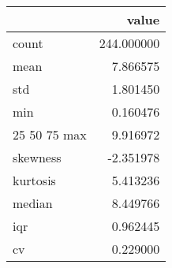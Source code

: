 \begin{tabular}{lr}
\toprule
 & value \\
\midrule
count & 244.000000 \\
mean & 7.866575 \\
std & 1.801450 \\
min & 0.160476 \\
25%
50%
75%
max & 9.916972 \\
skewness & -2.351978 \\
kurtosis & 5.413236 \\
median & 8.449766 \\
iqr & 0.962445 \\
cv & 0.229000 \\
\bottomrule
\end{tabular}
